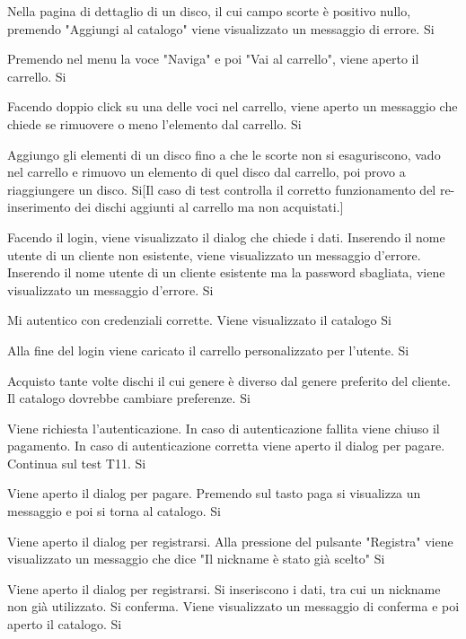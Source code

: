     {Nella pagina di dettaglio di un disco, il cui campo scorte è positivo  nullo, premendo "Aggiungi al catalogo" viene visualizzato un messaggio di errore.}
    {Si}

    {Premendo nel menu la voce "Naviga" e poi "Vai al carrello", viene aperto il carrello.}
    {Si}

    {Facendo doppio click su una delle voci nel carrello, viene aperto un messaggio che chiede se rimuovere o meno l'elemento dal carrello.}
    {Si}

    {Aggiungo gli elementi di un disco fino a che le scorte non si esaguriscono, vado nel carrello e rimuovo un elemento di quel disco dal carrello, poi provo a riaggiungere un disco.}
    {Si}[Il caso di test controlla il corretto funzionamento del re-inserimento dei dischi aggiunti al carrello ma non acquistati.]

    {Facendo il login, viene visualizzato il dialog che chiede i dati. Inserendo il nome utente di un cliente non esistente, viene visualizzato un messaggio d'errore. Inserendo il nome utente di un cliente esistente ma la password sbagliata, viene visualizzato un messaggio d'errore.}
    {Si}

    {Mi autentico con credenziali corrette. Viene visualizzato il catalogo}
    {Si}

    {Alla fine del login viene caricato il carrello personalizzato per l'utente.}
    {Si}
    
    {Acquisto tante volte dischi il cui genere è diverso dal genere preferito del cliente. Il catalogo dovrebbe cambiare preferenze.}
    {Si}

    {Viene richiesta l'autenticazione. In caso di autenticazione fallita viene chiuso il pagamento. In caso di autenticazione corretta viene aperto il dialog per pagare. Continua sul test T11.}
    {Si}

    {Viene aperto il dialog per pagare. Premendo sul tasto paga si visualizza un messaggio e poi si torna al catalogo.}
    {Si}

    {Viene aperto il dialog per registrarsi. Alla pressione del pulsante "Registra" viene visualizzato un messaggio che dice "Il nickname è stato già scelto"}
    {Si}

    {Viene aperto il dialog per registrarsi. Si inseriscono i dati, tra cui un nickname non già utilizzato. Si conferma. Viene visualizzato un messaggio di conferma e poi aperto il catalogo.}
    {Si}


